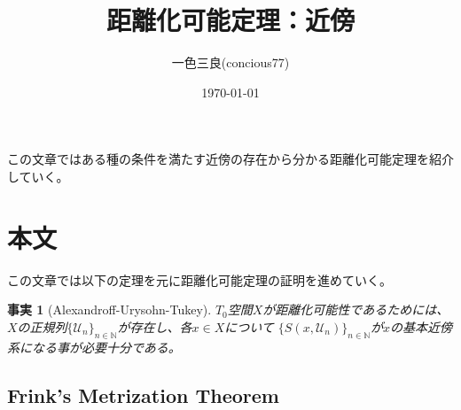 \documentclass[leqno]{jsarticle}
\title{距離化可能定理：近傍}
\author{一色三良(concious77)}
\date{\today}
\newtheorem{fact}[thm]{事実}
\newcommand{\nn}{\mathbb{N}}
\begin{document}
\maketitle

この文章ではある種の条件を満たす近傍の存在から分かる距離化可能定理を紹介していく。
\section{本文}
この文章では以下の定理を元に距離化可能定理の証明を進めていく。
\begin{fact}[Alexandroff-Urysohn-Tukey]\label{AUT}
$T_0$空間$X$が距離化可能性であるためには、
$X$の正規列$\{\mathcal{U}_n\}_{n\in \nn}$が存在し、各$x\in X$について
$\{S(x,\mathcal{U}_n)\}_{n\in \nn}$が$x$の基本近傍系になる事が必要十分である。
\end{fact}

\subsection{Frink's Metrization Theorem}
\end{document}
